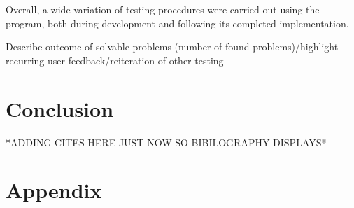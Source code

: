 \documentclass{l3proj}
\begin{document}
Overall, a wide variation of testing procedures were carried out using the program, both during development and following its completed implementation.

Describe outcome of solvable problems (number of found problems)/highlight recurring user feedback/reiteration of other testing

\chapter{Conclusion}
\label{conclusion}

*ADDING CITES HERE JUST NOW SO BIBILOGRAPHY DISPLAYS*
\cite{2DAPI,Swing,Graphics,BeginnerGo,GoProbs,AI,MCG}




\chapter{Appendix}
\label{appendix}


\end{document}
